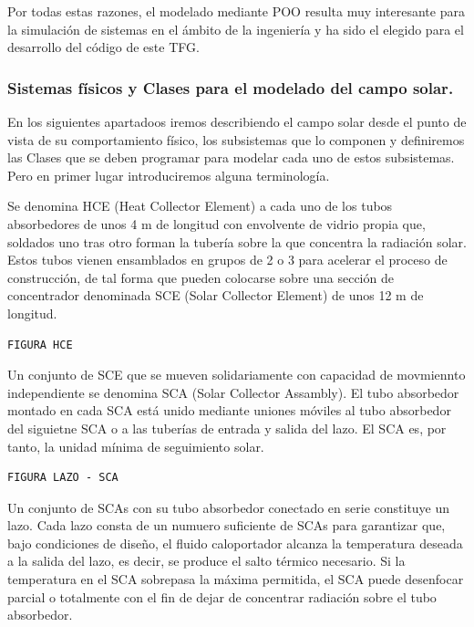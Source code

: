 Por todas estas razones, el modelado mediante POO resulta muy
interesante para la simulación de sistemas en el ámbito de la ingeniería
y ha sido el elegido para el desarrollo del código de este TFG.

\hypertarget{sistemas-fuxedsicos-y-clases-para-el-modelado-del-campo-solar.}{%
\subsubsection{Sistemas físicos y Clases para el modelado del campo
solar.}\label{sistemas-fuxedsicos-y-clases-para-el-modelado-del-campo-solar.}}

En los siguientes apartadoos iremos describiendo el campo solar desde el
punto de vista de su comportamiento físico, los subsistemas que lo
componen y definiremos las Clases que se deben programar para modelar
cada uno de estos subsistemas. Pero en primer lugar introduciremos
alguna terminología.

Se denomina HCE (Heat Collector Element) a cada uno de los tubos
absorbedores de unos 4 m de longitud con envolvente de vidrio propia
que, soldados uno tras otro forman la tubería sobre la que concentra la
radiación solar. Estos tubos vienen ensamblados en grupos de 2 o 3 para
acelerar el proceso de construcción, de tal forma que pueden colocarse
sobre una sección de concentrador denominada SCE (Solar Collector
Element) de unos 12 m de longitud.

\begin{verbatim}
FIGURA HCE
\end{verbatim}

Un conjunto de SCE que se mueven solidariamente con capacidad de
movmiennto independiente se denomina SCA (Solar Collector Assambly). El
tubo absorbedor montado en cada SCA está unido mediante uniones móviles
al tubo absorbedor del siguietne SCA o a las tuberías de entrada y
salida del lazo. El SCA es, por tanto, la unidad mínima de seguimiento
solar.

\begin{verbatim}
FIGURA LAZO - SCA
\end{verbatim}

Un conjunto de SCAs con su tubo absorbedor conectado en serie constituye
un lazo. Cada lazo consta de un numuero suficiente de SCAs para
garantizar que, bajo condiciones de diseño, el fluido caloportador
alcanza la temperatura deseada a la salida del lazo, es decir, se
produce el salto térmico necesario. Si la temperatura en el SCA
sobrepasa la máxima permitida, el SCA puede desenfocar parcial o
totalmente con el fin de dejar de concentrar radiación sobre el tubo
absorbedor.

